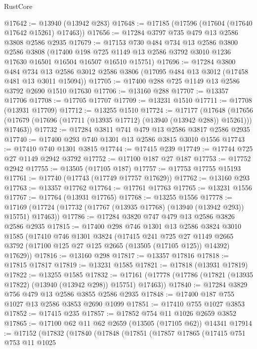 \begin{lexlean}{RustCore}
\begin{coremodule}
@17642 := @13940 (@13942 @283)
@17648 := @17185 (@17596 (@17604 (@17640 @17642 @15261) @17463))
@17656 := @17284 @3797 @735 @479 @13 @2586 @3808 @2586 @2935
@17679 := @17153
    @730
    @484
    @734
    @13
    @2586
    @3800
    @2586
    @3808
    (@17400 @198 @725 @1149 @13 @2586 @3792 @3010 @1236 @17630 @16501 @16504 @16507 @16510 @15751)
@17696 := @17284
    @3800
    @484
    @734
    @13
    @2586
    @3012
    @2586
    @3806
    (@17095 @484 @13 @3012 (@17458 @481 @13 @3011 @15094))
@17705 := @17400 @288 @725 @1149 @13 @2586 @3792 @2690 @1510 @17630
@17706 := @13160 @288
@17707 := @13357 @17706
@17708 := @17705 @17707
@17709 := @13231 @1510
@17711 := @17708 (@13931 @17709)
@17712 := @13255 @1510
@17724 := @17177
    (@17648
      (@17656 (@17679 (@17696 (@17711 (@13935 @17712) (@13940 (@13942 @288)) @15261))) @17463))
@17732 := @17284 @3811 @741 @479 @13 @2586 @3817 @2586 @2935
@17740 := @17400 @293 @740 @1301 @13 @2586 @3815 @3010 @1556
@17743 := @17410 @740 @1301 @3815
@17744 := @17415 @239
@17749 := @17744 @725 @27 @1149 @2942 @3792
@17752 := @17100 @187 @27 @187
@17753 := @17752 @2942
@17755 := @13505 (@17105 @187)
@17757 := @17753 @17755 @15193
@17761 := @17740 (@17743 (@17749 @17757 @17629))
@17762 := @13160 @293
@17763 := @13357 @17762
@17764 := @17761 @17763
@17765 := @13231 @1556
@17767 := @17764 (@13931 @17765)
@17768 := @13255 @1556
@17778 := @17169 (@17724 (@17732 (@17767 (@13935 @17768) (@13940 (@13942 @293)) @15751) @17463))
@17786 := @17284 @3820 @747 @479 @13 @2586 @3826 @2586 @2935
@17815 := @17400
    @298
    @746
    @1301
    @13
    @2586
    @3824
    @3010
    @1585
    (@17410
      @746
      @1301
      @3824
      (@17415
        @241
        @725
        @27
        @1149
        @2665
        @3792
        (@17100 @125 @27 @125 @2665 (@13505 (@17105 @125)) @14392)
        @17629))
@17816 := @13160 @298
@17817 := @13357 @17816
@17818 := @17815 @17817
@17819 := @13231 @1585
@17821 := @17818 (@13931 @17819)
@17822 := @13255 @1585
@17832 := @17161 (@17778 (@17786 (@17821 (@13935 @17822) (@13940 (@13942 @298)) @15751) @17463))
@17840 := @17284 @3829 @756 @479 @13 @2586 @3855 @2586 @2935
@17848 := @17400 @187 @755 @1027 @13 @2586 @3853 @2690 @1099
@17851 := @17410 @755 @1027 @3853
@17852 := @17415 @235
@17857 := @17852 @754 @11 @1026 @2659 @3852
@17865 := @17100 @62 @11 @62 @2659 (@13505 (@17105 @62)) @14341
@17914 := @17152
    (@17832
      (@17840
        (@17848
          (@17851
            (@17857
              @17865
              (@17415
                @751
                @753
                @11
                @1025

\end{coremodule}
\end{lexlean}
